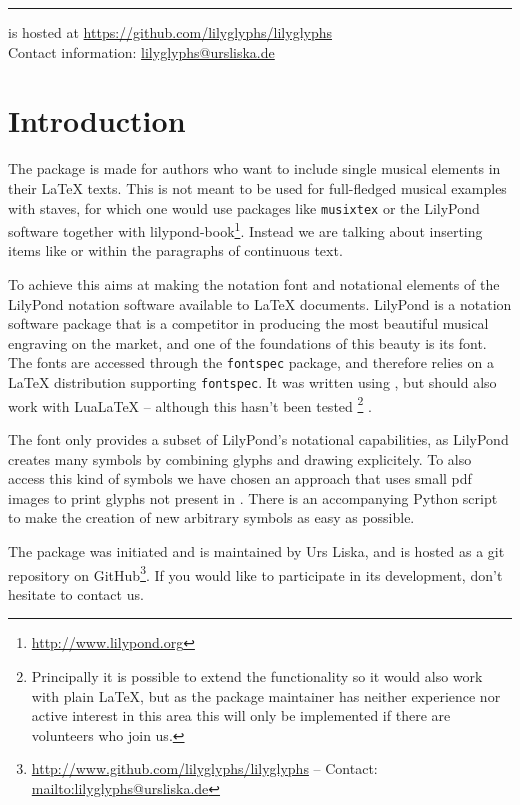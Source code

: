 \documentclass{article}
\begin{document}
\hrule
\bigskip
\noindent
\lilyglyphs{} is hosted at \url{https://github.com/lilyglyphs/lilyglyphs}\\
Contact information: \href{mailto:lilyglyphs@ursliska.de}{lilyglyphs@ursliska.de}
\pagebreak

\tableofcontents

\pagebreak
\section{Introduction}
\label{sec:introduction}
The package \lilyglyphs is made for authors who want to include single musical elements in their \LaTeX{} texts. 
This is not meant to be used for full-fledged musical examples with staves, for which one would use packages like \texttt{musixtex} or the LilyPond software together with lilypond-book\footnote{\url{http://www.lilypond.org}}. 
Instead we are talking about inserting items like \quaver or \lilyRFZ within the paragraphs of continuous text.

To achieve this \lilyglyphs aims at making the notation font and notational elements of the LilyPond notation software available to \LaTeX{} documents.
LilyPond is a notation software package that is a competitor in producing the most beautiful musical engraving on the market, and one of the foundations of this beauty is its \emmentaler font.
The \emmentaler fonts are accessed through the \texttt{fontspec} package, and \lilyglyphs therefore relies on a \LaTeX{} distribution supporting \texttt{fontspec}. 
It was written using \XeLaTeX, but should also work with LuaLaTeX -- although this hasn't been tested%
\footnote{Principally it is possible to extend the functionality so it would also work with plain \LaTeX, but as the package maintainer has neither experience nor active interest in this area this will only be implemented if there are volunteers who join us.}%
.

The \emmentaler font only provides a subset of LilyPond's notational capabilities, as LilyPond creates many symbols by combining glyphs and drawing explicitely.
To also access this kind of symbols we have chosen an approach that uses small pdf images to print glyphs not present in \emmentaler.
There is an accompanying Python script to make the creation of new arbitrary symbols as easy as possible.

The \lilyglyphs package was initiated and is maintained by Urs Liska, and is hosted as a git repository on GitHub\footnote{\url{http://www.github.com/lilyglyphs/lilyglyphs} -- Contact: \url{mailto:lilyglyphs@ursliska.de}}.
If you would like to participate in its development, don't hesitate to contact us.
\end{document}
